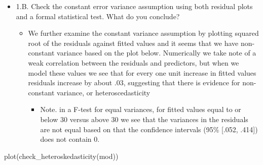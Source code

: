 \documentclass[
  letterpaper,
  DIV=11,
  numbers=noendperiod]{scrartcl}
\newenvironment{Shaded}{\begin{snugshade}}{\end{snugshade}}
\newcommand{\FunctionTok}[1]{\textcolor[rgb]{0.28,0.35,0.67}{#1}}
\newcommand{\NormalTok}[1]{\textcolor[rgb]{0.00,0.23,0.31}{#1}}
\providecommand{\tightlist}{%
  \setlength{\itemsep}{0pt}\setlength{\parskip}{0pt}}\usepackage{longtable,booktabs,array}
\begin{document}
\begin{itemize}
\item
  1.B. Check the constant error variance assumption using both residual
  plots and a formal statistical test. What do you conclude?

  \begin{itemize}
  \tightlist
  \item
    We further examine the constant variance assumption by plotting
    squared root of the residuals against fitted values and it seems
    that we have non-constant variance based on the plot below.
    Numerically we take note of a weak correlation between the residuals
    and predictors, but when we model these values we see that for every
    one unit increase in fitted values residuals increase by about .03,
    suggesting that there is evidence for non-constant variance, or
    heteroscedasticity

    \begin{itemize}
    \tightlist
    \item
      Note. in a F-test for equal variances, for fitted values equal to
      or below 30 versus above 30 we see that the variances in the
      residuals are not equal based on that the confidence intervals
      (95\% {[}.052, .414{]}) does not contain 0.
    \end{itemize}
  \end{itemize}
\end{itemize}

\begin{Shaded}
\begin{Highlighting}[]
\FunctionTok{plot}\NormalTok{(}\FunctionTok{check\_heteroskedasticity}\NormalTok{(mod))}
\end{Highlighting}
\end{Shaded}

\end{document}
